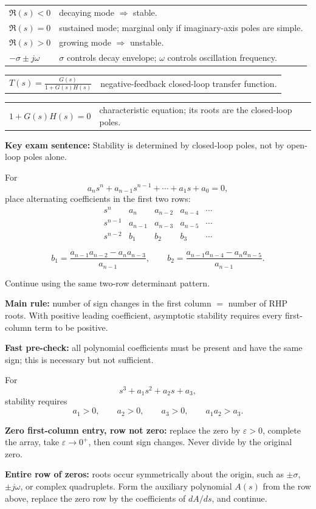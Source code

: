 \documentclass[a4paper,8pt]{extarticle}
\makeatletter
\newcommand{\topicdot}[1]{\tikz[baseline=-0.6ex]\fill[#1] (0,0) circle (0.52ex);}
\newcommand{\Cdot}{\topicdot{classicalDot}}
\newcommand{\mybox}[2]{
\begin{tcolorbox}[
  enhanced,
  colback=lightblue!7!white,
  colframe=lightblue!78!black,
  boxrule=0.38pt,
  boxsep=0.7pt,
  left=1.7pt,right=1.7pt,top=1.5pt,bottom=1.5pt,
  arc=0.8pt,outer arc=0.8pt,
  title={\small\textbf{#1}},
  fonttitle=\bfseries,
  coltitle=black,
  before skip=1.5pt,after skip=1.5pt,
  fontupper=\fontsize{5.55pt}{6.30pt}\selectfont\RaggedRight
]
#2
\end{tcolorbox}}
\newcommand{\frow}[2]{%
\begin{tabularx}{\linewidth}{@{}>{$\displaystyle}l<{$}@{\hspace{3pt}}X@{}}
#1 & #2
\end{tabularx}\vspace{0.3pt}}
\newcommand{\qrow}[2]{%
\textbf{#1} #2\par}
\newcommand{\tinyhead}[1]{\textbf{#1}\;}
\makeatother
\begin{document}
\begin{multicols}{3}
{\begin{tabularx}{\linewidth}{@{}lX@{}}
$\Re(s)<0$ & decaying mode $\Rightarrow$ stable.\\
$\Re(s)=0$ & sustained mode; marginal only if imaginary-axis poles are simple.\\
$\Re(s)>0$ & growing mode $\Rightarrow$ unstable.\\
$-\sigma\pm j\omega$ & $\sigma$ controls decay envelope; $\omega$ controls oscillation frequency.\\
\end{tabularx}

\frow{T(s)=\frac{G(s)}{1+G(s)H(s)}}{negative-feedback closed-loop transfer function.}
\frow{1+G(s)H(s)=0}{characteristic equation; its roots are the closed-loop poles.}

\qrow{Key exam sentence:}{Stability is determined by closed-loop poles, not by open-loop poles alone.}
}

\mybox{Routh--Hurwitz: Construction \& Decision \Cdot}{
For
\[
a_ns^n+a_{n-1}s^{n-1}+\cdots+a_1s+a_0=0,
\]
place alternating coefficients in the first two rows:
\[
\begin{array}{c|cccc}
s^n&a_n&a_{n-2}&a_{n-4}&\cdots\\
s^{n-1}&a_{n-1}&a_{n-3}&a_{n-5}&\cdots\\
s^{n-2}&b_1&b_2&b_3&\cdots
\end{array}
\]

\[
b_1=
\frac{a_{n-1}a_{n-2}-a_na_{n-3}}
{a_{n-1}},
\qquad
b_2=
\frac{a_{n-1}a_{n-4}-a_na_{n-5}}
{a_{n-1}}.
\]

Continue using the same two-row determinant pattern.

\tinyhead{Main rule:} number of sign changes in the first column $=$ number of RHP roots. With positive leading coefficient, asymptotic stability requires every first-column term to be positive.

\tinyhead{Fast pre-check:} all polynomial coefficients must be present and have the same sign; this is necessary but not sufficient.

For
\[
s^3+a_1s^2+a_2s+a_3,
\]
stability requires
\[
a_1>0,\qquad
a_2>0,\qquad
a_3>0,\qquad
a_1a_2>a_3.
\]
}

\mybox{Routh Special Cases \& Gain Range \Cdot}{
\tinyhead{Zero first-column entry, row not zero:}
replace the zero by $\varepsilon>0$, complete the array, take $\varepsilon\to0^+$, then count sign changes. Never divide by the original zero.

\tinyhead{Entire row of zeros:}
roots occur symmetrically about the origin, such as $\pm\sigma$, $\pm j\omega$, or complex quadruplets. Form the auxiliary polynomial $A(s)$ from the row above, replace the zero row by the coefficients of $dA/ds$, and continue.

}
\end{multicols}
\end{document}
